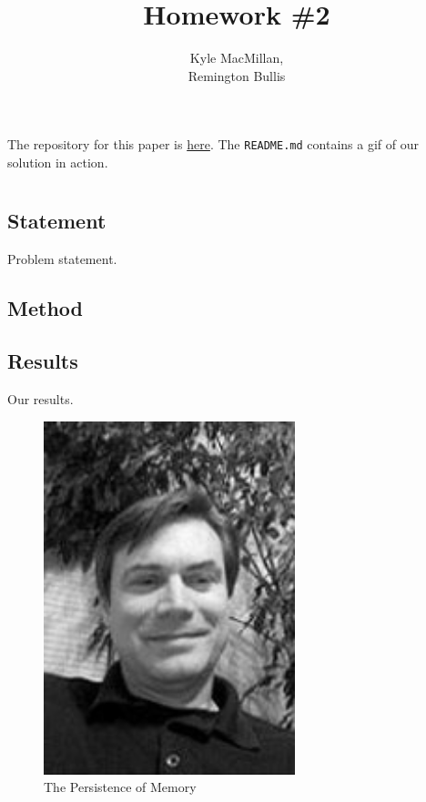\documentclass[12pt]{article}
\title{Homework \#2}
\author{Kyle MacMillan, \\Remington Bullis}
\begin{document}
\maketitle

The repository for this paper is \href{https://github.com/macattackftw/ncGA}{here}. 
The \texttt{README.md} contains a gif of our solution in action.

\section{} %

\subsection{Statement}
Problem statement.

\subsection{Method}


\newpage
\subsection{Results}
Our results.

\begin{figure}[H]
\centering
\noindent\includegraphics[width=0.65\textwidth]{../images/jmcgough}
\caption{The Persistence of Memory}
\label{fig:jmcgough}
\end{figure}
\end{document}
